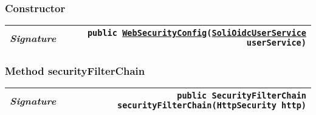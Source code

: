 \begin{adjustwidth}{1.5em}{0pt}
\begin{adjustwidth}{1.5em}{0pt}
{\begin{tabularx}{1.0\linewidth}{@{}l R@{}}
    \end{tabularx}}\subsubsection{Constructor\label{edu.kit.hci.soli.config.security.WebSecurityConfig@edu.kit.hci.soli.config.security.WebSecurityConfig(edu.kit.hci.soli.config.security.SoliOidcUserService)}}
    \begin{adjustwidth}{1.5em}{0pt}
      {\begin{tabularx}{1.0\linewidth}{@{}l R@{}}
        \emph{Signature} & \texttt{public \texttt{\hyperref[edu.kit.hci.soli.config.security.WebSecurityConfig]{\texttt{WebSecurityConfig}}}(\texttt{\hyperref[edu.kit.hci.soli.config.security.SoliOidcUserService]{\texttt{SoliOidcUserService}}} userService)} \\
        \hline
  
      \end{tabularx}}
    \end{adjustwidth}\subsubsection{Method securityFilterChain\label{edu.kit.hci.soli.config.security.WebSecurityConfig@securityFilterChain(org.springframework.security.config.annotation.web.builders.HttpSecurity)}}
    \begin{adjustwidth}{1.5em}{0pt}
      {\begin{tabularx}{1.0\linewidth}{@{}l R@{}}
        \emph{Signature} & \texttt{public \texttt{SecurityFilterChain} securityFilterChain(\texttt{HttpSecurity} http)} \\
        \hline
  
      \end{tabularx}}
    \end{adjustwidth}
  \end{adjustwidth}
\end{adjustwidth}